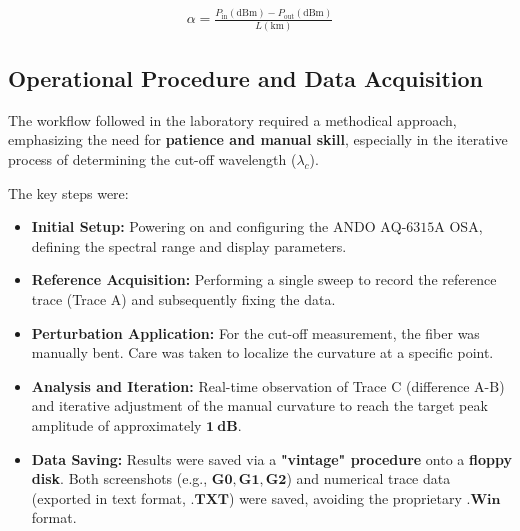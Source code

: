 \documentclass[a4paper,11pt]{article}
\theoremstyle{mythmstyle}
\begin{document}
\begin{align}
\alpha = \frac{P_{\text{in}} (\text{dBm}) - P_{\text{out}} (\text{dBm})}{L (\text{km})}
\end{align}

\subsection{Operational Procedure and Data Acquisition}
The workflow followed in the laboratory required a methodical approach, emphasizing the need for \textbf{patience and manual skill}, especially in the iterative process of determining the cut-off wavelength ($\lambda_c$).

The key steps were:
\begin{itemize}
    \item \textbf{Initial Setup:} Powering on and configuring the $\text{ANDO\ AQ-6315A}$ OSA, defining the spectral range and display parameters.
    \item \textbf{Reference Acquisition:} Performing a single sweep to record the reference trace (Trace A) and subsequently fixing the data.
    \item \textbf{Perturbation Application:} For the cut-off measurement, the fiber was manually bent. Care was taken to localize the curvature at a specific point.
    \item \textbf{Analysis and Iteration:} Real-time observation of Trace C (difference $\text{A-B}$) and iterative adjustment of the manual curvature to reach the target peak amplitude of approximately $\mathbf{1\ \text{dB}}$.
    \item \textbf{Data Saving:} Results were saved via a \textbf{"vintage" procedure} onto a \textbf{floppy disk}. Both screenshots (e.g., $\mathbf{G0, G1, G2}$) and numerical trace data (exported in text format, $\mathbf{.TXT}$) were saved, avoiding the proprietary $\mathbf{.Win}$ format.
\end{itemize}
\end{document}
